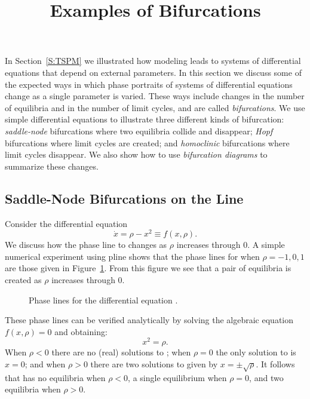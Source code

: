 \documentclass{ximera}
\title{Examples of Bifurcations}
\begin{document}
\begin{abstract}
\end{abstract}
\maketitle


\label{S:bifurcation} 

In Section~\ref{S:TSPM} we illustrated how modeling leads to systems 
of differential equations that depend on external parameters.  In this 
section we discuss some of the expected ways in which phase portraits of 
systems of differential equations change as a single parameter is varied.  
These ways include changes in the number of equilibria and in the number 
of limit cycles, and are called {\em bifurcations\/}.   We use simple 
differential equations to illustrate three different kinds of bifurcation: 
{\em saddle-node\/} bifurcations where two equilibria collide and disappear; 
{\em Hopf\/} bifurcations where limit cycles are created; and 
{\em homoclinic\/} bifurcations where limit cycles disappear.  We also show 
how to use {\em bifurcation diagrams\/} to summarize these changes.

\subsection*{Saddle-Node Bifurcations on the Line}

Consider the differential equation
\begin{equation}  \label{E:sbif}
\dot{x} = \rho - x^2 \equiv f(x,\rho).
\end{equation}
We discuss how the phase line to  changes as $\rho$ increases 
through $0$.  A simple numerical experiment using {\sf pline} shows that
the phase lines for  when $\rho=-1,0,1$ are those given in 
Figure~\ref{F:sbif}.  From this figure we see that a pair of equilibria 
is created as $\rho$ increases through $0$.

\vspace{0.4in}

\begin{figure}[htb]
           \centerline{%
           }
           \caption{Phase lines for the differential equation 
    		\protect{}.}
           \label{F:sbif}
\end{figure}


These phase lines can be verified analytically by solving the 
algebraic equation $f(x,\rho)=0$ and obtaining:
\begin{equation} \label{E:sbife}
x^2 = \rho.
\end{equation}
When $\rho<0$ there are no (real) solutions to ; when
$\rho=0$ the only solution to  is $x=0$; and when $\rho>0$
there are two solutions to  given by $x=\pm\sqrt{\rho}$.
It follows that  has no equilibria when $\rho<0$, a single
equilibrium when $\rho=0$, and two equilibria when $\rho>0$.
\end{document}
